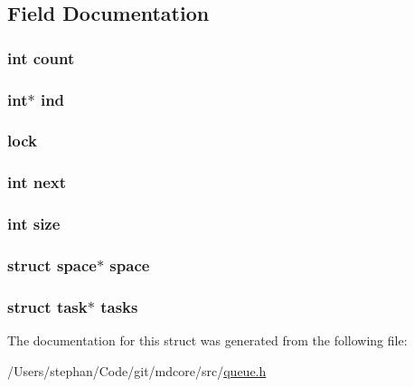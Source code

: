 \subsection{Field Documentation}
\hypertarget{structqueue_ad43c3812e6d13e0518d9f8b8f463ffcf}{
\subsubsection[{count}]{\setlength{\rightskip}{0pt plus 5cm}int count}}\label{structqueue_ad43c3812e6d13e0518d9f8b8f463ffcf}
\hypertarget{structqueue_abf6fe97795b10bba2698b51120e35186}{
\subsubsection[{ind}]{\setlength{\rightskip}{0pt plus 5cm}int$\ast$ ind}}\label{structqueue_abf6fe97795b10bba2698b51120e35186}
\hypertarget{structqueue_ad30fc7af2401a1e1b6b9152df1646ac4}{
\subsubsection[{lock}]{ lock}}\label{structqueue_ad30fc7af2401a1e1b6b9152df1646ac4}
\hypertarget{structqueue_a142a1b51e133e50c0a72b175958ac412}{
\subsubsection[{next}]{\setlength{\rightskip}{0pt plus 5cm}int next}}\label{structqueue_a142a1b51e133e50c0a72b175958ac412}
\hypertarget{structqueue_a439227feff9d7f55384e8780cfc2eb82}{
\subsubsection[{size}]{\setlength{\rightskip}{0pt plus 5cm}int size}}\label{structqueue_a439227feff9d7f55384e8780cfc2eb82}
\hypertarget{structqueue_a7bfa55c955401f156a7a8cfada4a0ed5}{
\subsubsection[{space}]{\setlength{\rightskip}{0pt plus 5cm}struct {\bf space}$\ast$ {\bf space}}}\label{structqueue_a7bfa55c955401f156a7a8cfada4a0ed5}
\hypertarget{structqueue_ace3a87c7e253bce95072d59dfcb2622f}{
\subsubsection[{tasks}]{\setlength{\rightskip}{0pt plus 5cm}struct {\bf task}$\ast$ tasks}}\label{structqueue_ace3a87c7e253bce95072d59dfcb2622f}


The documentation for this struct was generated from the following file\-:\begin{DoxyCompactItemize}
\item 
/\-Users/stephan/\-Code/git/mdcore/src/\hyperlink{queue_8h}{queue.\-h}\end{DoxyCompactItemize}
